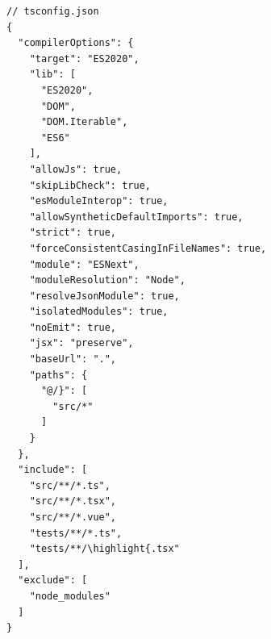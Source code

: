 
\begin{lstlisting}[style=json]
// tsconfig.json
{
  "compilerOptions": {
    "target": "ES2020",
    "lib": [
      "ES2020",
      "DOM",
      "DOM.Iterable",
      "ES6"
    ],
    "allowJs": true,
    "skipLibCheck": true,
    "esModuleInterop": true,
    "allowSyntheticDefaultImports": true,
    "strict": true,
    "forceConsistentCasingInFileNames": true,
    "module": "ESNext",
    "moduleResolution": "Node",
    "resolveJsonModule": true,
    "isolatedModules": true,
    "noEmit": true,
    "jsx": "preserve",
    "baseUrl": ".",
    "paths": {
      "@/}": [
        "src/*"
      ]
    }
  },
  "include": [
    "src/**/*.ts",
    "src/**/*.tsx", 
    "src/**/*.vue",
    "tests/**/*.ts",
    "tests/**/\highlight{.tsx"
  ],
  "exclude": [
    "node_modules"
  ]
}
\end{lstlisting}


